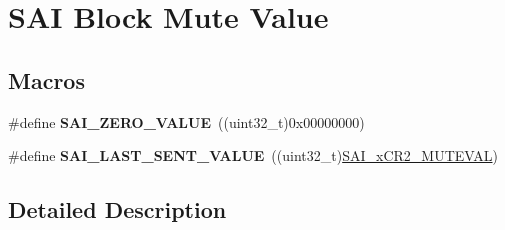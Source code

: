 \hypertarget{group___s_a_i___block___mute___value}{}\section{S\+AI Block Mute Value}
\label{group___s_a_i___block___mute___value}
\subsection*{Macros}
\begin{DoxyCompactItemize}
\item 
\#define {\bfseries S\+A\+I\+\_\+\+Z\+E\+R\+O\+\_\+\+V\+A\+L\+UE}~((uint32\+\_\+t)0x00000000)\hypertarget{group___s_a_i___block___mute___value_ga78d93f0af5b91627e9ee7ba7b8d3707b}{}\label{group___s_a_i___block___mute___value_ga78d93f0af5b91627e9ee7ba7b8d3707b}

\item 
\#define {\bfseries S\+A\+I\+\_\+\+L\+A\+S\+T\+\_\+\+S\+E\+N\+T\+\_\+\+V\+A\+L\+UE}~((uint32\+\_\+t)\hyperlink{group___peripheral___registers___bits___definition_ga5ba4ba2073e0737d432aeca306cc47e2}{S\+A\+I\+\_\+x\+C\+R2\+\_\+\+M\+U\+T\+E\+V\+AL})\hypertarget{group___s_a_i___block___mute___value_ga99c8cfc342db371e80c631de46f626e0}{}\label{group___s_a_i___block___mute___value_ga99c8cfc342db371e80c631de46f626e0}

\end{DoxyCompactItemize}


\subsection{Detailed Description}

